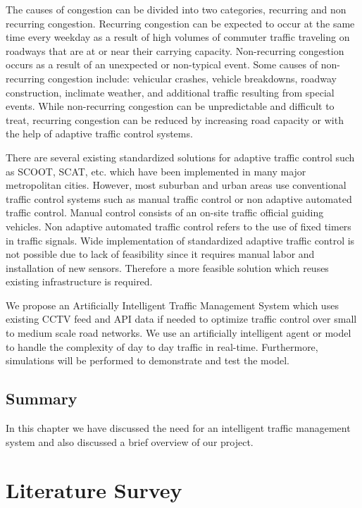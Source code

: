 \documentclass[openany,12pt]{report}
\begin{document}
The causes of congestion can be divided into two categories, recurring and non recurring congestion. Recurring congestion can be expected to occur at the same time every weekday as a result of high volumes of commuter traffic traveling on roadways that are at or near their carrying capacity. Non-recurring congestion occurs as a result of an unexpected or non-typical event. Some causes of non-recurring congestion include: vehicular crashes, vehicle breakdowns, roadway construction, inclimate weather, and additional traffic resulting from special events. While non-recurring congestion can be unpredictable and difficult to treat, recurring congestion can be reduced by increasing road capacity or with the help of adaptive traffic control systems.

There are several existing standardized solutions for adaptive traffic control such as SCOOT, SCAT, etc. which have been implemented in many major metropolitan cities. However, most suburban and urban areas use conventional traffic control systems such as manual traffic control or non adaptive automated traffic control. Manual control consists of an on-site traffic official guiding vehicles. Non adaptive automated traffic control refers to the use of fixed timers in traffic signals. Wide implementation of standardized adaptive traffic control is not possible due to lack of feasibility since it requires manual labor and installation of new sensors. Therefore a more feasible solution which reuses existing infrastructure is required.

We propose an Artificially Intelligent Traffic Management System which uses existing CCTV feed and API data if needed to optimize traffic control over small to medium scale road networks. We use an artificially intelligent agent or model to handle the complexity of day to day traffic in real-time. Furthermore, simulations will be performed to demonstrate and test the model.\\

\section{Summary}
\hspace*{0.5in}In this chapter we have discussed the need for an intelligent traffic management system and also discussed a brief overview of our project.\\
\chapter{Literature Survey}
\end{document}
